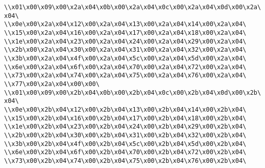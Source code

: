 \verb|\\x01\x00\x09\x00\x2a\x04\x0b\x00\x2a\x04\x0c\x00\x2a\x04\x0d\x00\x2a\x04\|\newline
\verb|\\x0e\x00\x2a\x04\x12\x00\x2a\x04\x13\x00\x2a\x04\x14\x00\x2a\x04\|\newline
\verb|\\x15\x00\x2a\x04\x16\x00\x2a\x04\x17\x00\x2a\x04\x18\x00\x2a\x04\|\newline
\verb|\\x1e\x00\x2a\x04\x23\x00\x2a\x04\x24\x00\x2a\x04\x29\x00\x2a\x04\|\newline
\verb|\\x2b\x00\x2a\x04\x30\x00\x2a\x04\x31\x00\x2a\x04\x32\x00\x2a\x04\|\newline
\verb|\\x3b\x00\x2a\x04\x4f\x00\x2a\x04\x5c\x00\x2a\x04\x5d\x00\x2a\x04\|\newline
\verb|\\x6e\x00\x2a\x04\x6f\x00\x2a\x04\x70\x00\x2a\x04\x72\x00\x2a\x04\|\newline
\verb|\\x73\x00\x2a\x04\x74\x00\x2a\x04\x75\x00\x2a\x04\x76\x00\x2a\x04\|\newline
\verb|\\x77\x00\x2a\x04\x00\x00\|\newline
\verb|\\x01\x00\x09\x00\x2b\x04\x0b\x00\x2b\x04\x0c\x00\x2b\x04\x0d\x00\x2b\x04\|\newline
\verb|\\x0e\x00\x2b\x04\x12\x00\x2b\x04\x13\x00\x2b\x04\x14\x00\x2b\x04\|\newline
\verb|\\x15\x00\x2b\x04\x16\x00\x2b\x04\x17\x00\x2b\x04\x18\x00\x2b\x04\|\newline
\verb|\\x1e\x00\x2b\x04\x23\x00\x2b\x04\x24\x00\x2b\x04\x29\x00\x2b\x04\|\newline
\verb|\\x2b\x00\x2b\x04\x30\x00\x2b\x04\x31\x00\x2b\x04\x32\x00\x2b\x04\|\newline
\verb|\\x3b\x00\x2b\x04\x4f\x00\x2b\x04\x5c\x00\x2b\x04\x5d\x00\x2b\x04\|\newline
\verb|\\x6e\x00\x2b\x04\x6f\x00\x2b\x04\x70\x00\x2b\x04\x72\x00\x2b\x04\|\newline
\verb|\\x73\x00\x2b\x04\x74\x00\x2b\x04\x75\x00\x2b\x04\x76\x00\x2b\x04\|\newline
